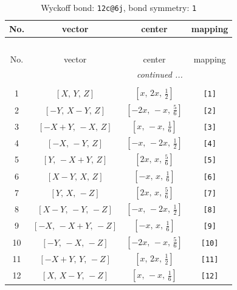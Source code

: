 \documentclass[fleqn,8pt]{jsarticle}
\begin{document}
\begin{longtable}{cccc}
\caption{Wyckoff bond: {\tt 12c@6j}, bond symmetry: {\tt 1}}
 \\
 \hline \hline
No. & vector & center & mapping \\ \hline \endfirsthead

\multicolumn{3}{l}{\tablename\ \thetable{}} \\
 \hline \hline
No. & vector & center & mapping \\ \hline \endhead

 \hline \hline
\multicolumn{3}{r}{\footnotesize\it continued ...} \\ \endfoot

 \hline \hline
\multicolumn{3}{r}{} \\ \endlastfoot

1 & $\left[ X,\, Y,\, Z \right]$ & $\left[ x,\, 2 x,\, \frac{1}{2} \right]$ & {\tt [1]} \\ \hline
2 & $\left[ - Y,\, X - Y,\, Z \right]$ & $\left[ - 2 x,\, - x,\, \frac{5}{6} \right]$ & {\tt [2]} \\ \hline
3 & $\left[ - X + Y,\, - X,\, Z \right]$ & $\left[ x,\, - x,\, \frac{1}{6} \right]$ & {\tt [3]} \\ \hline
4 & $\left[ - X,\, - Y,\, Z \right]$ & $\left[ - x,\, - 2 x,\, \frac{1}{2} \right]$ & {\tt [4]} \\ \hline
5 & $\left[ Y,\, - X + Y,\, Z \right]$ & $\left[ 2 x,\, x,\, \frac{5}{6} \right]$ & {\tt [5]} \\ \hline
6 & $\left[ X - Y,\, X,\, Z \right]$ & $\left[ - x,\, x,\, \frac{1}{6} \right]$ & {\tt [6]} \\ \hline
7 & $\left[ Y,\, X,\, - Z \right]$ & $\left[ 2 x,\, x,\, \frac{5}{6} \right]$ & {\tt [7]} \\ \hline
8 & $\left[ X - Y,\, - Y,\, - Z \right]$ & $\left[ - x,\, - 2 x,\, \frac{1}{2} \right]$ & {\tt [8]} \\ \hline
9 & $\left[ - X,\, - X + Y,\, - Z \right]$ & $\left[ - x,\, x,\, \frac{1}{6} \right]$ & {\tt [9]} \\ \hline
10 & $\left[ - Y,\, - X,\, - Z \right]$ & $\left[ - 2 x,\, - x,\, \frac{5}{6} \right]$ & {\tt [10]} \\ \hline
11 & $\left[ - X + Y,\, Y,\, - Z \right]$ & $\left[ x,\, 2 x,\, \frac{1}{2} \right]$ & {\tt [11]} \\ \hline
12 & $\left[ X,\, X - Y,\, - Z \right]$ & $\left[ x,\, - x,\, \frac{1}{6} \right]$ & {\tt [12]} \\
\end{longtable}
\end{document}
